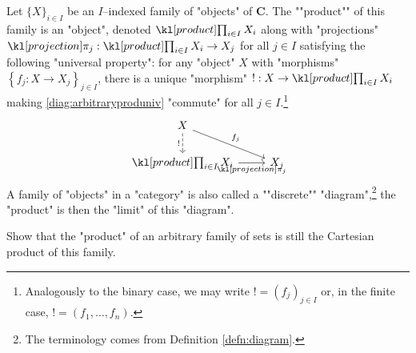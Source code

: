 \documentclass[main.tex]{subfiles}
\begin{document}
\begin{defn}[Product]
    \AP Let $\{X\}_{i \in I}$ be an $I$--indexed family of "objects" of $\mathbf{C}$. The ""product"" of this family is an "object", denoted $\Product_{i \in I} X_i$ along with "projections" $\projection_j: \Product_{i \in I} X_i \rightarrow X_j$ for all $j \in I$ satisfying the following "universal property": for any "object" $X$ with "morphisms" $\left\{ f_j: X\rightarrow X_j\right\}_{j \in I}$, there is a unique "morphism" $!: X \rightarrow \Product_{i \in I} X_i$ making \eqref{diag:arbitraryproduniv} "commute" for all $j \in I$.\footnote{Analogously to the binary case, we may write $! = (f_j)_{j\in I}$ or, in the finite case, $! = (f_1, \dots, f_n)$.}
    \begin{equation}\label{diag:arbitraryproduniv}
        \begin{tikzcd}
        X \arrow[d, "!"', dashed] \arrow[rd, "f_j"] &     \\
        \Product_{i \in I}X_i \arrow[r, "\projection_j"']     & X_j
        \end{tikzcd}
    \end{equation}
    A family of "objects" in a "category" is also called a ""discrete"" "diagram",\footnote{The terminology comes from Definition \ref{defn:diagram}.} the "product" is then the "limit" of this "diagram".
\end{defn}
\begin{exer}
    Show that the "product" of an arbitrary family of sets is still the Cartesian product of this family.
\end{exer}
\end{document}
